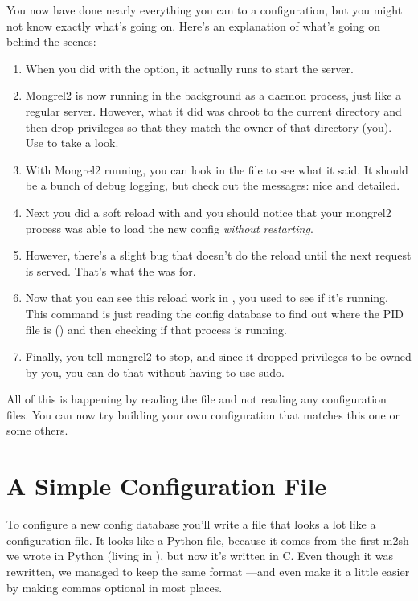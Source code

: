 You now have done nearly everything you can to a configuration, but you might not know exactly
what's going on.  Here's an explanation of what's going on behind the scenes:

\begin{enumerate}
\item When you did  with the  option, it actually runs
     to start the server.
\item Mongrel2 is now running in the background as a daemon process, just like a regular server.
    However, what it did was chroot to the current directory and then drop privileges so that
    they match the owner of that directory (you).  Use  to take a look.
\item With Mongrel2 running, you can look in the  file to see what it said.  It should
    be a bunch of debug logging, but check out the messages: nice and detailed.
\item Next you did a soft reload with  and you should notice that your mongrel2
    process was able to load the new config \emph{without restarting}.
\item However, there's a slight bug that doesn't do the reload until the next request is served. That's
    what the  was for.
\item Now that you can see this reload work in , you used  to
    see if it's running.  This command is just reading the config database to find out where the PID file
    is () and then checking if that process is running.
\item Finally, you tell mongrel2 to stop, and since it dropped privileges to be owned by you, you can do
    that without having to use sudo.
\end{enumerate}

All of this is happening by reading the  file and not reading any configuration
files.  You can now try building your own configuration that matches this one or some others.


\section{A Simple Configuration File}

To configure a new config database you'll write a file that looks a lot like
a configuration file.  It looks like a Python file, because it comes from the
first m2sh we wrote in Python (living in ), but now it's
written in C\@.  Even though it was rewritten, we managed to keep the same format
---and even make it a little easier by making commas optional in most places.


